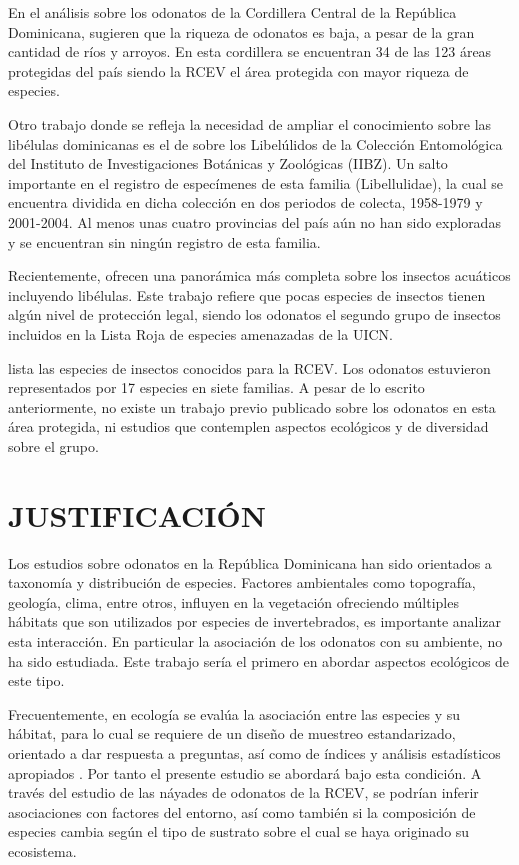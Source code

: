 \documentclass[12pt,letterpaper,spanish]{article}
\begin{document}
En el análisis sobre los odonatos de la Cordillera Central de la República Dominicana, \citet{sanchez2014analisis} sugieren que la riqueza de odonatos es baja, a pesar de la gran cantidad de ríos y arroyos. En esta cordillera se encuentran 34 de las 123 áreas protegidas del país siendo la RCEV el área protegida con mayor riqueza de especies.

Otro trabajo donde se refleja la necesidad de ampliar el conocimiento sobre las libélulas dominicanas es el de \citet{sanchez2015libelulidos} sobre los Libelúlidos de la Colección Entomológica del Instituto de Investigaciones Botánicas y Zoológicas (IIBZ). Un salto importante en el registro de especímenes de esta familia (Libellulidae), la cual se encuentra dividida en dicha colección en dos periodos de colecta, 1958-1979 y 2001-2004. Al menos unas cuatro provincias del país aún no han sido exploradas y se encuentran sin ningún registro de esta familia.

Recientemente, \citep{bastardo2017estado} ofrecen una panorámica más completa sobre los insectos acuáticos incluyendo libélulas. Este trabajo refiere que pocas especies de insectos tienen algún nivel de protección legal, siendo los odonatos el segundo grupo de insectos incluidos en la Lista Roja de especies amenazadas de la UICN.

\citet{perez2015entomofauna} lista las especies de insectos conocidos para la RCEV. Los odonatos estuvieron representados por 17 especies en siete familias. A pesar de lo escrito anteriormente, no existe un trabajo previo publicado sobre los odonatos en esta área protegida, ni estudios que contemplen aspectos ecológicos y de diversidad sobre el grupo. 

\newpage
\section*{JUSTIFICACIÓN}

Los estudios sobre odonatos en la República Dominicana han sido orientados a taxonomía y distribución de especies. Factores ambientales como topografía, geología, clima, entre otros, influyen en la vegetación \citep{castillo1997estudios, may2007composicion} ofreciendo múltiples hábitats que son utilizados por especies de invertebrados, es importante analizar esta interacción. En particular la asociación de los odonatos con su ambiente, no ha sido estudiada. Este trabajo sería el primero en abordar aspectos ecológicos de este tipo.

Frecuentemente, en ecología se evalúa la asociación entre las especies y su hábitat, para lo cual se requiere de un diseño de muestreo estandarizado, orientado a dar respuesta a preguntas, así como de índices y análisis estadísticos apropiados \citep{caceres2009associations}. Por tanto el presente estudio se abordará bajo esta condición. A través del estudio de las náyades de odonatos de la RCEV, se podrían inferir asociaciones con factores del entorno, así como también si la composición de especies cambia según el tipo de sustrato sobre el cual se haya originado su ecosistema.
\end{document}
